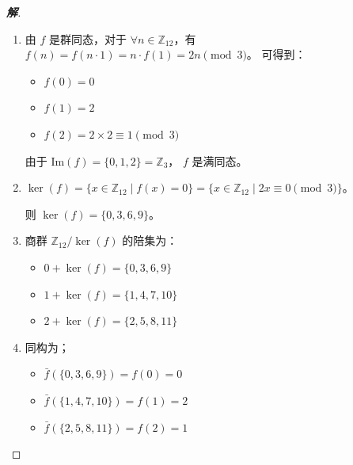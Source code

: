 \documentclass[12pt, a4paper]{article}
\newenvironment{solution}{
    \begin{proof}[\textbf{解}]
}{
    \end{proof}
}
\begin{document}
\begin{solution}
    \begin{enumerate}[(1)]
        \item 由 $f$ 是群同态，对于 $\forall n \in \mathbb{Z}_{12}$，有 $f(n) = f(n \cdot 1) = n \cdot f(1) = 2n \pmod{3}$。
        可得到：
        \begin{itemize}
            \item $f(0) = 0$
            \item $f(1) = 2$
            \item $f(2) = 2 \times 2 \equiv 1 \pmod{3}$
        \end{itemize}
        由于 $\text{Im}(f) = \{0, 1, 2\} = \mathbb{Z}_3$， $f$ 是满同态。

        \item $\ker(f) = \{x \in \mathbb{Z}_{12} \mid f(x) = 0\} = \{x \in \mathbb{Z}_{12} \mid 2x \equiv 0 \pmod{3}\}$。
        
            则 $\ker(f) = \{0, 3, 6, 9\}$。

        \item 商群 $\mathbb{Z}_{12}/\ker(f)$ 的陪集为：
        \begin{itemize}
            \item $0 + \ker(f) = \{0, 3, 6, 9\}$
            \item $1 + \ker(f) = \{1, 4, 7, 10\}$
            \item $2 + \ker(f) = \{2, 5, 8, 11\}$
        \end{itemize}

        \item
        同构为；
        \begin{itemize}
            \item $\bar{f}(\{0, 3, 6, 9\}) = f(0) = 0$
            \item $\bar{f}(\{1, 4, 7, 10\}) = f(1) = 2$
            \item $\bar{f}(\{2, 5, 8, 11\}) = f(2) = 1$
        \end{itemize}
    \end{enumerate}
\end{solution}
\end{document}
